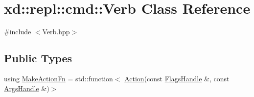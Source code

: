 \hypertarget{classxd_1_1repl_1_1cmd_1_1_verb}{}\section{xd\+:\+:repl\+:\+:cmd\+:\+:Verb Class Reference}
\label{classxd_1_1repl_1_1cmd_1_1_verb}


{\ttfamily \#include $<$Verb.\+hpp$>$}

\subsection*{Public Types}
\begin{DoxyCompactItemize}
\item 
using \mbox{\hyperlink{classxd_1_1repl_1_1cmd_1_1_verb_a4697828dfca6ef6386df54aa3a6a5857}{Make\+Action\+Fn}} = std\+::function$<$ \mbox{\hyperlink{namespacexd_1_1repl_1_1cmd_a7274841bd02a9c5da0ba48ae204ab3d5}{Action}}(const \mbox{\hyperlink{classxd_1_1repl_1_1cmd_1_1_flags_handle}{Flags\+Handle}} \&, const \mbox{\hyperlink{classxd_1_1repl_1_1cmd_1_1_args_handle}{Args\+Handle}} \&)$>$
\end{DoxyCompactItemize}
